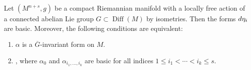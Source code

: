 \documentclass[10pt,a4paper]{amsart}
\begin{document}
\begin{prop}\label{InvFor} Let $(M^{n+s},g)$ be a compact Riemannian manifold with a locally free action of a connected abelian Lie group $G\subset \operatorname{Diff}(M)$ by isometries. Then the forms ${\rm d}\eta_i$ are basic. Moreover, the following conditions are equivalent:
\begin{enumerate}\itemsep=0pt
\item[$(1)$] $\alpha$ is a $\overline{G}$-invariant form on $M$.
\item[$(2)$] , where $\alpha_0$ and $\alpha_{i_1,\dots,i_k}$ are basic for all indices $1\leq i_1<\cdots <i_k\leq s$.
\end{enumerate}
\end{prop}
\end{document}

